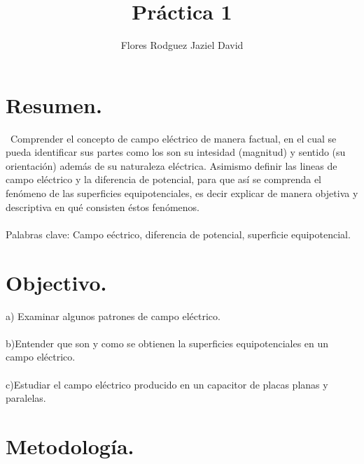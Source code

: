 \documentclass[11pt,a4paper]{article}
\author{Flores Rodguez Jaziel David }
\title{Práctica 1}
\begin{document}
\tableofcontents
\medskip
\section{Resumen.}
\
Comprender el concepto de campo el\'{e}ctrico de manera factual, en el cual se pueda identificar sus partes como los son su intesidad (magnitud) y sentido (su orientaci\'{o}n) adem\'{a}s de su naturaleza el\'{e}ctrica. Asimismo definir las lineas de campo el\'{e}ctrico y la diferencia de potencial, para que as\'{i} se comprenda el fen\'{o}meno de las superficies equipotenciales, es decir explicar de manera objetiva y descriptiva en qu\'{e} consisten \'{e}stos fen\'{o}menos. 
\\
\\
\medskip
Palabras clave: Campo e\'{e}ctrico, diferencia de potencial, superficie equipotencial.


\section{Objectivo.}
a) Examinar algunos patrones de campo el\'{e}ctrico.
\\
\\
b)Entender que son y como se obtienen la superficies equipotenciales en un campo el\'{e}ctrico.
\\
\\
c)Estudiar el campo el\'{e}ctrico producido en un capacitor de placas planas y paralelas.
\pagebreak


\section{Metodolog\'{i}a.}
\end{document}
